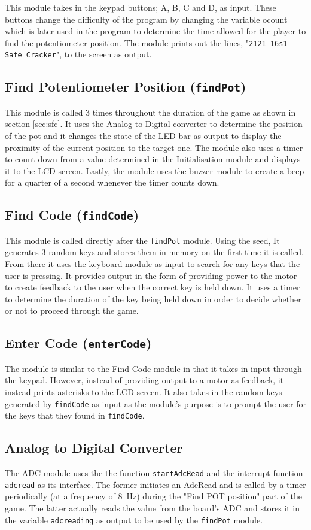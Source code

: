 \documentclass[a4paper]{article}
\begin{document}
This module takes in the keypad buttons; A, B, C and D, as input. These buttons change the difficulty of the
program by changing the variable ocount which is later used in the program to determine the time allowed for 
the player to find the potentiometer position. The module prints out the lines, "\texttt{2121 16s1 Safe Cracker}", to the screen as output.


\subsection{Find Potentiometer Position (\texttt{findPot})}
This module is called 3 times throughout the duration of the game as shown in section \ref{sec:sfc}. It uses the
Analog to Digital converter to determine the position of the pot and it changes the state of the LED bar as
output to display the proximity of the current position to the target one. The module also uses a timer to count
down from a value determined in the Initialisation module and displays it to the LCD screen. Lastly, the module
uses the buzzer module to create a beep for a quarter of a second whenever the timer counts down.

\subsection{Find Code (\texttt{findCode})}
This module is called directly after the \verb|findPot| module. Using the seed, It generates 3 random keys and 
stores them in memory on the first time it is called. From there it uses the keyboard module as input to search
for any keys that the user is pressing. It provides output in the form of providing power to the motor to
create feedback to the user when the correct key is held down. It uses a timer to determine the duration of
the key being held down in order to decide whether or not to proceed through the game.

\subsection{Enter Code (\texttt{enterCode})}
The module is similar to the Find Code module in that it takes in input through the keypad. However, instead of
providing output to a motor as feedback, it instead prints asterisks to the LCD screen. It also takes in the
random keys generated by \verb|findCode| as input as the module's purpose is to prompt the user for the keys
that they found in \verb|findCode|.

\subsection{Analog to Digital Converter}
The ADC module uses the the function \verb|startAdcRead| and the interrupt function \verb|adcread| as its 
interface. The former initiates an AdcRead and is called by a timer periodically (at a frequency of 
\SI{8}{\hertz}) during the "Find POT position" part of the game. The latter actually reads the value from the 
board's ADC and stores it in the variable \verb|adcreading| as output to be used by the \verb|findPot| module.
\end{document}
